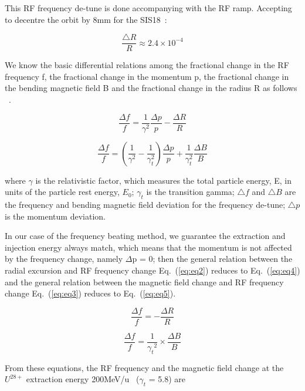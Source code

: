   This RF frequency de-tune is done accompanying with the RF ramp. Accepting to decentre the orbit by 8mm for the SIS18~\cite{SIS18_man}: 

\begin{equation}
\frac{\bigtriangleup{R}}{R}\approx{2.4}{\times}10^{-4}\label{eq1}
\end{equation}

  We know the basic differential relations among the fractional change in the RF frequency f, the fractional change in the momentum p, the fractional change in the bending magnetic field B and the fractional change in the radius R as follows ~\cite{J-PARC}.


\begin{equation}
\label{eq:eq2}
\frac{\Delta{f}}{f} ={\frac{1}{\gamma^2}}{\frac{\Delta{p}}{p}} - \frac{\Delta{R}}{R}
\end{equation}

\begin{equation}
\frac{\Delta{f}}{f} = (\frac{1}{\gamma^2}-\frac{1}{\gamma_t^2})\frac{\Delta{p}}{p}+{\frac{1}{\gamma_t^2}}{\frac{\Delta{B}}{B}}
\label{eq:eq3}
\end{equation}


where $\gamma$ is the relativistic factor, which measures the total particle energy, E, in
units of the particle rest energy, $E_0$; $\gamma_t$ is the transition gamma; $\bigtriangleup{f}$ and  $\bigtriangleup{B}$ are the frequency and  bending magnetic field deviation for the frequency de-tune;  $\bigtriangleup{p}$ is the momentum deviation.

In our case of the frequency beating method, we guarantee the extraction and injection energy always match, which means that the momentum is not affected by the frequency change, namely $\Delta$p = 0; then the general relation between the radial excursion and RF frequency change Eq.~(\ref{eq:eq2}) reduces to Eq.~(\ref{eq:eq4}) and the general relation between the magnetic field change and RF frequency change Eq.~(\ref{eq:eq3}) reduces to Eq.~(\ref{eq:eq5}).

\begin{equation}
\frac{\Delta{f}}{f} = - \frac{\Delta{R}}{R}
\label{eq:eq4}
\end{equation}

\begin{equation}
\frac{\Delta{f}}{f} =  \frac{1}{{\gamma_t}^2}\times{\frac{\Delta{B}}{B}}
\label{eq:eq5}
\end{equation}

From these equations, the RF frequency and the magnetic field change at the $U^{28+}$  extraction energy 200MeV/u~\cite{SIS18_man} ($\gamma_t$ = 5.8) are 

